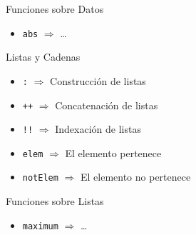\begin{frame}[fragile]{Funciones sobre Datos}
    \begin{itemize}
        \item \verb|abs| $\Rightarrow$ \dots
    \end{itemize}
\end{frame}

\begin{frame}[fragile]{Listas y Cadenas}
    \begin{itemize}
        \item \verb|:| $\Rightarrow$ Construcción de listas
        \item \verb|++| $\Rightarrow$ Concatenación de listas
        \item \verb|!!| $\Rightarrow$ Indexación de listas
        \item \verb|elem| $\Rightarrow$ El elemento pertenece
        \item \verb|notElem| $\Rightarrow$ El elemento no pertenece
    \end{itemize}
\end{frame}

\begin{frame}[fragile]{Funciones sobre Listas}
    \begin{itemize}
        \item \verb|maximum| $\Rightarrow$ \dots
    \end{itemize}
\end{frame}

